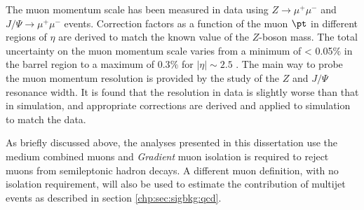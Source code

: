 The muon momentum scale has been measured in data using $Z\to \mu^{+}\mu^{-}$ and $J/\Psi \to \mu^{+} \mu^{-}$ events. Correction factors as a function of the muon $\pt$ in different regions of $\eta$ are derived to match the known value of the $Z$-boson mass. The total uncertainty on the muon momentum scale varies from a minimum of < 0.05$\%$ in the barrel region to a maximum of 0.3$\%$ for $|\eta|\sim 2.5$ \cite{Aad:2016jkr}. The main way to probe the muon momentum resolution is provided by the study of the $Z$ and $J/\Psi$ resonance width. It is found that the resolution in data is slightly worse than that in simulation, and appropriate corrections are derived and applied to simulation to match the data.\par
As briefly discussed above, the analyses presented in this dissertation use the medium combined muons and {\sl Gradient} muon isolation is required to reject muons from semileptonic hadron decays. A different muon definition, with no isolation requirement, will also be used to estimate the contribution of multijet events as described in section \ref{chp:sec:sigbkg:qcd}.
